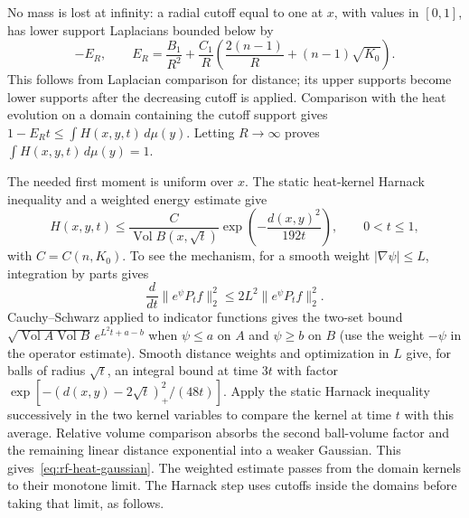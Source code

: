 No mass is lost at infinity: a radial cutoff equal to one
at $x$, with values in $[0,1]$, has lower support Laplacians bounded
below by
\[
 -E_R,\qquad E_R=\frac{B_1}{R^2}
       +\frac{C_1}{R}\left(\frac{2(n-1)}R
                                      +(n-1)\sqrt{K_0}\right).
\]
This follows from Laplacian comparison for distance; its upper
supports become lower supports after the decreasing cutoff is
applied.  Comparison with the heat evolution on a domain containing
the cutoff support gives $1-E_Rt\leq\int H(x,y,t)\,d\mu(y)$.
Letting $R\to\infty$ proves $\int H(x,y,t)\,d\mu(y)=1$.

The needed first moment is uniform over $x$.  The static heat-kernel
Harnack inequality and a weighted energy estimate give
\begin{equation}\label{eq:rf-heat-gaussian}
 H(x,y,t)\leq\frac{C}{\operatorname{Vol}B(x,\sqrt t)}
                    \exp\left(-\frac{d(x,y)^2}{192t}\right),
 \qquad 0<t\leq1,
\end{equation}
with $C=C(n,K_0)$.  To see the mechanism, for a smooth weight
$|\nabla\psi|\leq L$, integration by parts gives
\[
 \frac{d}{dt}\|e^\psi P_t f\|_2^2
 \leq2L^2\|e^\psi P_t f\|_2^2.
\]
Cauchy--Schwarz applied to indicator functions gives the two-set
bound $\sqrt{\operatorname{Vol}A\operatorname{Vol}B}\,
e^{L^2t+a-b}$ when $\psi\leq a$ on $A$ and $\psi\geq b$ on $B$
(use the weight $-\psi$ in the operator estimate).
Smooth distance weights and optimization in $L$ give, for balls of
radius $\sqrt t$, an integral bound at time $3t$ with factor
$\exp[-(d(x,y)-2\sqrt t)_+^2/(48t)]$.
Apply the static Harnack inequality successively in the two kernel
variables to compare the kernel at time $t$ with this average.
Relative volume comparison absorbs the second ball-volume factor
and the remaining linear distance exponential into a weaker
Gaussian.  This gives~\eqref{eq:rf-heat-gaussian}.
The weighted estimate passes from the domain kernels to their
monotone limit.  The Harnack step uses cutoffs inside the domains
before taking that limit, as follows.

